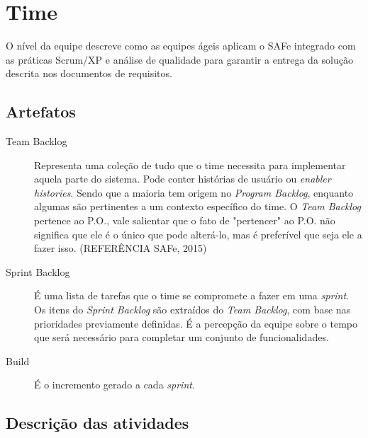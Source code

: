 \section{Time}
O nível da equipe descreve como as equipes ágeis aplicam o SAFe integrado com as práticas Scrum/XP e análise de qualidade para garantir a entrega da solução descrita nos documentos de requisitos.

\subsection{Artefatos}
\begin{description}
\item[Team Backlog] Representa uma coleção de tudo que o time necessita para implementar aquela parte do sistema. Pode conter histórias de usuário ou \textit{enabler histories}. Sendo que a maioria tem origem no \textit{Program Backlog}, enquanto algumas são pertinentes a um contexto específico do time. O \textit{Team Backlog} pertence ao P.O., vale salientar que o fato de "pertencer" ao P.O. não significa que ele é o único que pode alterá-lo, mas é preferível que seja ele a fazer isso. (REFERÊNCIA SAFe, 2015)
\item[Sprint Backlog] É uma lista de tarefas que o time se compromete a fazer em uma \textit{sprint}. Os itens do \textit{Sprint Backlog} são extraídos do \textit{Team Backlog}, com base nas prioridades previamente definidas. É a percepção da equipe sobre o tempo que será necessário para completar um conjunto de funcionalidades.
\item[Build] É o incremento gerado a cada \textit{sprint}.
\end{description}

\clearpage

\subsection{Descrição das atividades}

